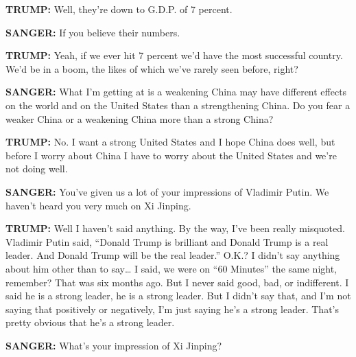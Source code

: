\textbf{TRUMP:} Well, they're down to G.D.P. of 7 percent.

\textbf{SANGER:} If you believe their numbers.

\textbf{TRUMP:} Yeah, if we ever hit 7 percent we'd have the most
successful country. We'd be in a boom, the likes of which we've rarely
seen before, right?

\textbf{SANGER:} What I'm getting at is a weakening China may have
different effects on the world and on the United States than a
strengthening China. Do you fear a weaker China or a weakening China
more than a strong China?

\textbf{TRUMP:} No. I want a strong United States and I hope China does
well, but before I worry about China I have to worry about the United
States and we're not doing well.

\textbf{SANGER:} You've given us a lot of your impressions of Vladimir
Putin. We haven't heard you very much on Xi Jinping.

\textbf{TRUMP:} Well I haven't said anything. By the way, I've been
really misquoted. Vladimir Putin said, ``Donald Trump is brilliant and
Donald Trump is a real leader. And Donald Trump will be the real
leader.'' O.K.? I didn't say anything about him other than to
say\ldots{} I said, we were on ``60 Minutes'' the same night, remember?
That was six months ago. But I never said good, bad, or indifferent. I
said he is a strong leader, he is a strong leader. But I didn't say
that, and I'm not saying that positively or negatively, I'm just saying
he's a strong leader. That's pretty obvious that he's a strong leader.

\textbf{SANGER:} What's your impression of Xi Jinping?

